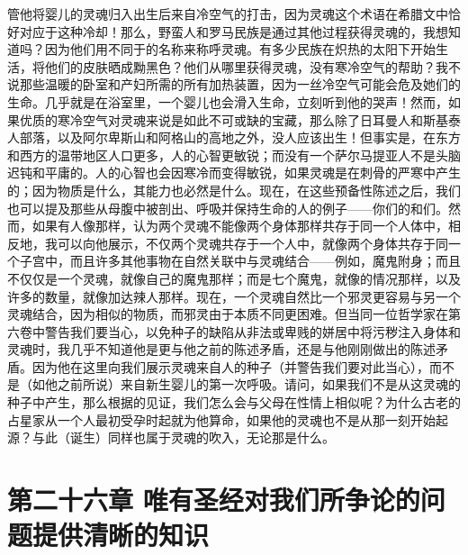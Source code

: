 管他将婴儿的灵魂归入出生后来自冷空气的打击，因为灵魂这个术语在希腊文中恰好对应于这种冷却！那么，野蛮人和罗马民族是通过其他过程获得灵魂的，我想知道吗？因为他们用不同于的名称来称呼灵魂。有多少民族在炽热的太阳下开始生活，将他们的皮肤晒成黝黑色？他们从哪里获得灵魂，没有寒冷空气的帮助？我不说那些温暖的卧室和产妇所需的所有加热装置，因为一丝冷空气可能会危及她们的生命。几乎就是在浴室里，一个婴儿也会滑入生命，立刻听到他的哭声！然而，如果优质的寒冷空气对灵魂来说是如此不可或缺的宝藏，那么除了日耳曼人和斯基泰人部落，以及阿尔卑斯山和阿格山的高地之外，没人应该出生！但事实是，在东方和西方的温带地区人口更多，人的心智更敏锐；而没有一个萨尔马提亚人不是头脑迟钝和平庸的。人的心智也会因寒冷而变得敏锐，如果灵魂是在刺骨的严寒中产生的；因为物质是什么，其能力也必然是什么。现在，在这些预备性陈述之后，我们也可以提及那些从母腹中被剖出、呼吸并保持生命的人的例子——你们的和们。然而，如果有人像那样，认为两个灵魂不能像两个身体那样共存于同一个人体中，相反地，我可以向他展示，不仅两个灵魂共存于一个人中，就像两个身体共存于同一个子宫中，而且许多其他事物在自然关联中与灵魂结合——例如，魔鬼附身；而且不仅仅是一个灵魂，就像自己的魔鬼那样；而是七个魔鬼，就像的情况那样，以及许多的数量，就像加达辣人那样。现在，一个灵魂自然比一个邪灵更容易与另一个灵魂结合，因为相似的物质，而邪灵由于本质不同更困难。但当同一位哲学家在第六卷中警告我们要当心，以免种子的缺陷从非法或卑贱的姘居中将污秽注入身体和灵魂时，我几乎不知道他是更与他之前的陈述矛盾，还是与他刚刚做出的陈述矛盾。因为他在这里向我们展示灵魂来自人的种子（并警告我们要对此当心），而不是（如他之前所说）来自新生婴儿的第一次呼吸。请问，如果我们不是从这灵魂的种子中产生，那么根据的见证，我们怎么会与父母在性情上相似呢？为什么古老的占星家从一个人最初受孕时起就为他算命，如果他的灵魂也不是从那一刻开始起源？与此（诞生）同样也属于灵魂的吹入，无论那是什么。\par


\section{第二十六章 唯有圣经对我们所争论的问题提供清晰的知识}

